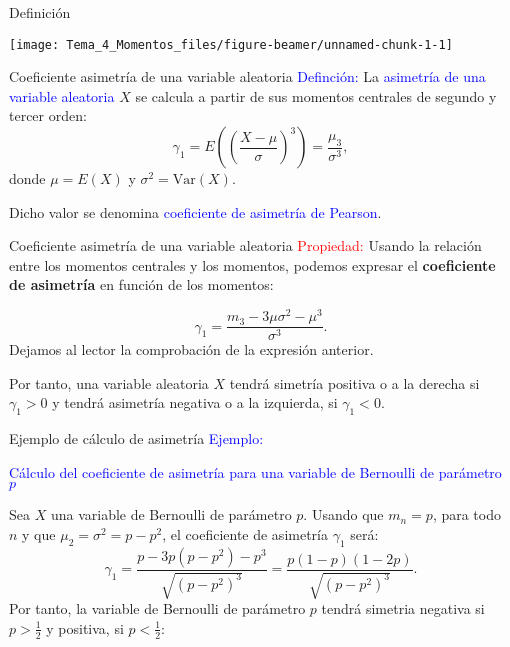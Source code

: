 \documentclass[
  ignorenonframetext,
  aspectratio=169]{beamer}
\newcommand\blue[1]{\textcolor{blue}{#1}}
\newcommand\red[1]{\textcolor{red}{#1}}
\begin{document}
\begin{frame}{Definición}
\protect\hypertarget{definiciuxf3n}{}
\begin{center}\texttt{[image: Tema\_4\_Momentos\_files/figure-beamer/unnamed-chunk-1-1]} \end{center}
\end{frame}

\begin{frame}{Coeficiente asimetría de una variable aleatoria}
\protect\hypertarget{coeficiente-asimetruxeda-de-una-variable-aleatoria}{}
\blue{Definción:} La \blue{asimetría de una variable aleatoria} \(X\) se
calcula a partir de sus momentos centrales de segundo y tercer orden: \[
\gamma_1 = E\left({\left(\frac{X-\mu}{\sigma}\right)}^3\right)=\frac{\mu_3}{\sigma^3},
\] donde \(\mu = E(X)\) y \(\sigma^2 =\mathrm{Var}(X)\).

Dicho valor se denomina \blue{coeficiente de asimetría de Pearson}.
\end{frame}

\begin{frame}{Coeficiente asimetría de una variable aleatoria}
\protect\hypertarget{coeficiente-asimetruxeda-de-una-variable-aleatoria-1}{}
\red{Propiedad:} Usando la relación entre los momentos centrales y los
momentos, podemos expresar el \textbf{coeficiente de asimetría} en
función de los momentos:

\[
\gamma_1 = \frac{m_3 -3\mu\sigma^2-\mu^3}{\sigma^3}.
\] Dejamos al lector la comprobación de la expresión anterior.

Por tanto, una variable aleatoria \(X\) tendrá simetría positiva o a la
derecha si \(\gamma_1 >0\) y tendrá asimetría negativa o a la izquierda,
si \(\gamma_1 <0\).
\end{frame}

\begin{frame}{Ejemplo de cálculo de asimetría}
\protect\hypertarget{ejemplo-de-cuxe1lculo-de-asimetruxeda}{}
\blue{Ejemplo:}

\blue{Cálculo del coeficiente de asimetría para una variable de Bernoulli de parámetro $p$}

Sea \(X\) una variable de Bernoulli de parámetro \(p\). Usando que
\(m_n =p\), para todo \(n\) y que \(\mu_2 = \sigma^2 = p-p^2\), el
coeficiente de asimetría \(\gamma_1\) será: \[
\gamma_1 = \frac{p-3p(p-p^2)-p^3}{\sqrt{(p-p^2)^3}} = \frac{p (1-p) (1-2p)}{{\sqrt{(p-p^2)^3}}}.
\] Por tanto, la variable de Bernoulli de parámetro \(p\) tendrá
simetria negativa si \(p>\frac{1}{2}\) y positiva, si \(p<\frac{1}{2}\):
\end{frame}
\end{document}
